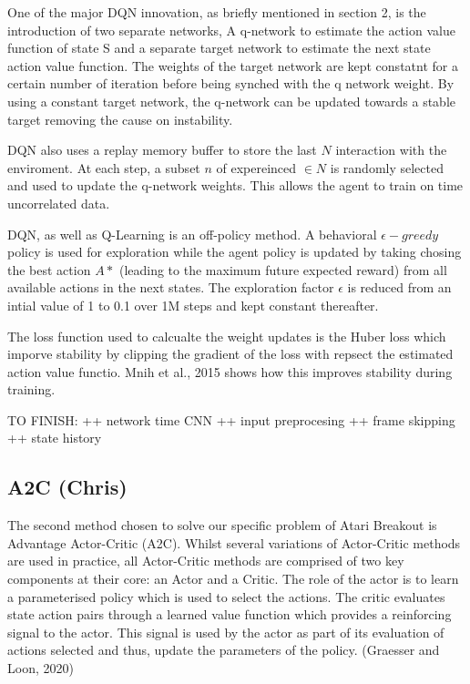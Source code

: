 \documentclass{article}
\begin{document}
One of the major DQN innovation, as briefly mentioned in section 2, is the introduction of two separate networks, A q-network to estimate the action value function of state S and a separate target network to estimate the next state action value function. The weights of the target network are kept constatnt for a certain number of iteration before being synched with the q network weight. By using a constant target network, the q-network can be updated towards a stable target removing the cause on instability.

DQN also uses a replay memory buffer to store the last $N$ interaction with the enviroment. At each step, a subset $n$ of expereinced $\in N $  is randomly selected and used to update the q-network weights.  This allows the agent to train on time uncorrelated data.

DQN, as well as Q-Learning is an off-policy method. A behavioral $\epsilon-greedy$ policy is used for exploration while the agent policy is updated by taking chosing the best action $A*$ (leading to the maximum future expected reward) from all available actions in the next states.
The exploration factor $\epsilon$ is reduced from an intial value of 1 to 0.1 over 1M steps and kept constant thereafter.

The loss function used to calcualte the weight updates is the Huber loss  which imporve stability by clipping the gradient of the loss with repsect the estimated action value functio. Mnih et al., 2015 shows how this improves stability during training.

TO FINISH:
++ network time CNN
++ input preprocesing
++ frame skipping
++ state history

\subsection{A2C (Chris)}

The second method chosen to solve our specific problem of Atari Breakout is Advantage Actor-Critic (A2C). Whilst several variations of Actor-Critic methods are used in practice, all Actor-Critic methods are comprised of two key components at their core: an Actor and a Critic. The role of the actor is to learn a parameterised policy which is used to select the actions. The critic evaluates state action pairs through a learned value function which provides a reinforcing signal to the actor. This signal is used by the actor as part of its evaluation of actions selected and thus, update the parameters of the policy. (Graesser and Loon, 2020)
\end{document}
